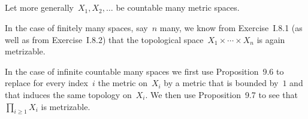 \subsection{}

Let more generally~$X_1, X_2, \dotsc$ be countable many metric spaces.

In the case of finitely many spaces, say~$n$ many, we know from Exercise~I.8.1 (as well as from Exercise~I.8.2) that the topological space~$X_1 × \dotsb × X_n$ is again metrizable.

In the case of infinite countable many spaces we first use Proposition~9.6 to replace for every index~$i$ the metric on~$X_i$ by a metric that is bounded by~$1$ and that induces the same topology on~$X_i$.
We then use Proposition~9.7 to see that~$∏_{i ≥ 1} X_i$ is metrizable.

